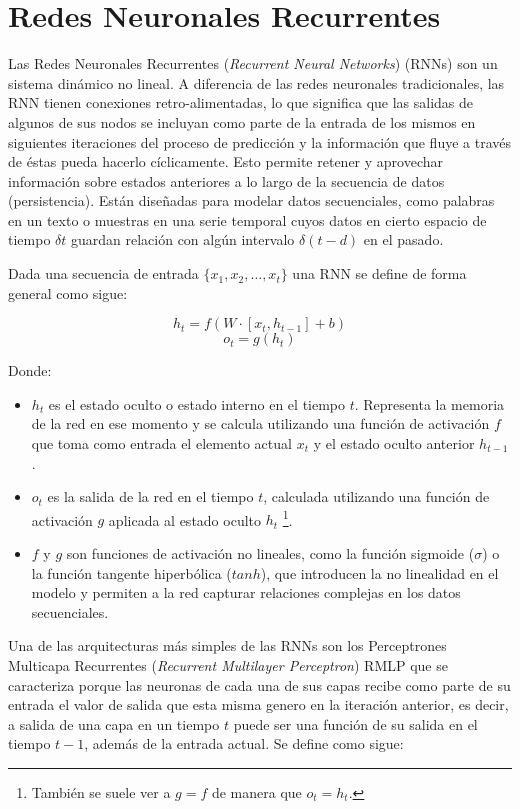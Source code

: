 \section{Redes Neuronales Recurrentes}

Las Redes Neuronales Recurrentes (\textit{Recurrent Neural Networks}) (RNNs) son un sistema dinámico no lineal. A diferencia de las redes neuronales tradicionales, las RNN tienen conexiones retro-alimentadas, lo que significa que las salidas de algunos de sus nodos se incluyan como parte de la entrada de los mismos en siguientes iteraciones del proceso de predicción y la información que fluye a través de éstas pueda hacerlo cíclicamente. Esto permite retener y aprovechar información sobre estados anteriores a lo largo de la secuencia de datos (persistencia). Están diseñadas para modelar datos secuenciales, como palabras en un texto o muestras en una serie temporal cuyos datos en cierto espacio de tiempo $\delta t$ guardan relación con algún intervalo $\delta (t-d)$ en el pasado. 

Dada una secuencia de entrada $\{ x_1, x_2, \ldots, x_t \}$%
una RNN se define de forma general como sigue:

\[ h_t = f(W \cdot [x_t, h_{t-1}] + b) \]
\[ o_t = g(h_t) \]

Donde:
\begin{itemize}
    \item $h_t$ es el estado oculto o estado interno en el tiempo $t$. Representa la memoria de la red en ese momento y se calcula utilizando una función de activación $f$ que toma como entrada el elemento actual $x_t$ y el estado oculto anterior $h_{t-1}$.
    \item $o_t$ es la salida de la red en el tiempo $t$, calculada utilizando una función de activación $g$ aplicada al estado oculto $h_t$ \footnote{También se suele ver a $g=f$ de manera que $o_t = h_t$.}.
    \item $f$ y $g$ son funciones de activación no lineales, como la función sigmoide ($\sigma$) o la función tangente hiperbólica ($tanh$), que introducen la no linealidad en el modelo y permiten a la red capturar relaciones complejas en los datos secuenciales.
\end{itemize}

Una de las arquitecturas más simples de las RNNs son los Perceptrones Multicapa Recurrentes (\textit{Recurrent Multilayer Perceptron}) RMLP que se caracteriza porque las neuronas de cada una de sus capas recibe como parte de su entrada el valor de salida que esta misma genero en la iteración anterior, es decir, a salida de una capa en un tiempo $t$ puede ser una función de su salida en el tiempo $t-1$, además de la entrada actual. Se define como sigue:

